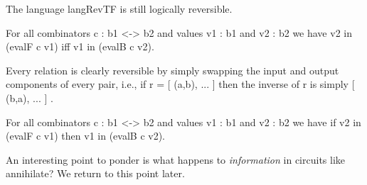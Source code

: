 \documentclass{llncs}
\begin{document}
\begin{definition}
\end{definition}

The language {{langRevTF}} is still logically reversible. 

\begin{proposition}
\label{chx:prop:logrev-tracep}
For all combinators {{c : b1 <-> b2}} and values {{v1 : b1}} and 
{{v2 : b2}} we have {{v2 in (evalF c v1)}} iff
{{v1 in (evalB c v2)}}.
\end{proposition}

Every relation is clearly reversible by simply swapping the input and
output components of every pair, i.e., if {{r = {[ (a,b), ... ]} }}
then the inverse of {{r}} is simply {{ {[ (b,a), ... ]} }}. 

\begin{proposition}
\label{prop:logrev-tracet}
For all combinators {{c : b1 <-> b2}} and values {{v1 : b1}} and 
{{v2 : b2}} we have if {{v2 in (evalF c v1)}} then 
{{v1 in (evalB c v2)}}.
\end{proposition}

An interesting point to ponder is what happens to \emph{information}
in circuits like {{annihilate}}? We return to this point later.
\end{document}
